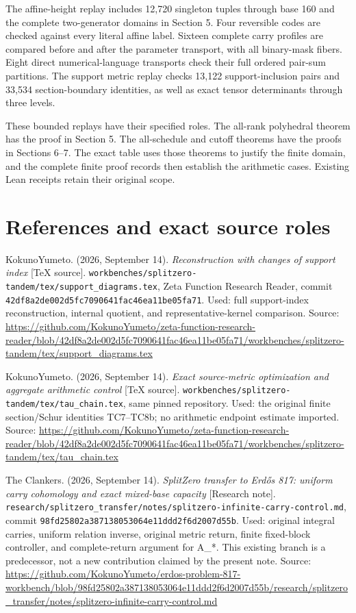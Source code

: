 The affine-height replay includes 12,720 singleton tuples through base 160 and the complete two-generator domains in Section 5. Four reversible codes are checked against every literal affine label. Sixteen complete carry profiles are compared before and after the parameter transport, with all binary-mask fibers. Eight direct numerical-language transports check their full ordered pair-sum partitions. The support metric replay checks 13,122 support-inclusion pairs and 33,534 section-boundary identities, as well as exact tensor determinants through three levels.

These bounded replays have their specified roles. The all-rank polyhedral theorem has the proof in Section 5. The all-schedule and cutoff theorems have the proofs in Sections 6--7. The exact table uses those theorems to justify the finite domain, and the complete finite proof records then establish the arithmetic cases. Existing Lean receipts retain their original scope.

\section{References and exact source roles}\label{n04-references-and-exact-source-roles}

KokunoYumeto. (2026, September 14). \emph{Reconstruction with changes of support index} {[}TeX source{]}. \nolinkurl{workbenches/splitzero-tandem/tex/support_diagrams.tex}, Zeta Function Research Reader, commit \nolinkurl{42df8a2de002d5fc7090641fac46ea11be05fa71}. Used: full support-index reconstruction, internal quotient, and representative-kernel comparison. Source: \url{https://github.com/KokunoYumeto/zeta-function-research-reader/blob/42df8a2de002d5fc7090641fac46ea11be05fa71/workbenches/splitzero-tandem/tex/support_diagrams.tex}

KokunoYumeto. (2026, September 14). \emph{Exact source-metric optimization and aggregate arithmetic control} {[}TeX source{]}. \nolinkurl{workbenches/splitzero-tandem/tex/tau_chain.tex}, same pinned repository. Used: the original finite section/Schur identities TC7--TC8b; no arithmetic endpoint estimate imported. Source: \url{https://github.com/KokunoYumeto/zeta-function-research-reader/blob/42df8a2de002d5fc7090641fac46ea11be05fa71/workbenches/splitzero-tandem/tex/tau_chain.tex}

The Clankers. (2026, September 14). \emph{SplitZero transfer to Erdős 817: uniform carry cohomology and exact mixed-base capacity} {[}Research note{]}. \nolinkurl{research/splitzero_transfer/notes/splitzero-infinite-carry-control.md}, commit \nolinkurl{98fd25802a387138053064e11ddd2f6d2007d55b}. Used: original integral carries, uniform relation inverse, original metric return, finite fixed-block controller, and complete-return argument for A\_*. This existing branch is a predecessor, not a new contribution claimed by the present note. Source: \url{https://github.com/KokunoYumeto/erdos-problem-817-workbench/blob/98fd25802a387138053064e11ddd2f6d2007d55b/research/splitzero_transfer/notes/splitzero-infinite-carry-control.md}

